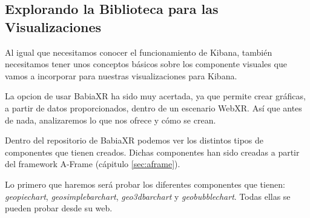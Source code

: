 \documentclass[a4paper, 12pt]{book}
\begin{document}
\subsection{Explorando la Biblioteca para las Visualizaciones}

Al igual que necesitamos conocer el funcionamiento de Kibana, también necesitamos tener unos conceptos básicos sobre los componente visuales que vamos a incorporar para nuestras visualizaciones para Kibana.

La opcion de usar BabiaXR ha sido muy acertada, ya que permite crear gráficas, a partir de datos proporcionados, dentro de un escenario WebXR. Así que antes de nada, analizaremos lo que nos ofrece y cómo se crean.

Dentro del repositorio de BabiaXR podemos ver los distintos tipos de componentes que tienen creados. Dichas componentes han sido creadas a partir del framework A-Frame (cápitulo \ref{sec:aframe}).

Lo primero que haremos será probar los diferentes componentes que tienen: \textit{geopiechart}, \textit{geosimplebarchart}, \textit{geo3dbarchart} y \textit{geobubblechart}. Todas ellas se pueden probar desde su web.
\end{document}
